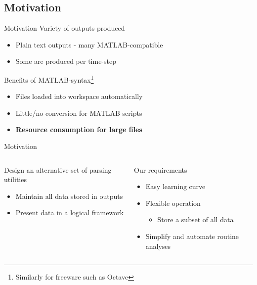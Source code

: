 \subsection{Motivation}
\begin{frame}{Motivation}
    Variety of outputs produced
    \begin{itemize}
        \item Plain text outputs - many MATLAB-compatible 
        \item Some are produced per time-step
    \end{itemize}
    Benefits of MATLAB-syntax\footnote{Similarly for freeware such as Octave}
    \begin{itemize}
        \item Files loaded into workspace automatically
        \item Little/no conversion for MATLAB scripts
        \item \textbf{Resource consumption for large files}
    \end{itemize}
\end{frame}

\begin{frame}{Motivation}
    \begin{columns}[T]
        \begin{column}{\colShare}
            Design an alternative set of parsing utilities
            \begin{itemize}
                \item Maintain all data stored in outputs
                \item Present data in a logical framework
            \end{itemize}
        \end{column}
        \begin{column}{\colShare}
            Our requirements
            \begin{itemize}
                \item Easy learning curve
                \item Flexible operation
                    \begin{itemize}
                        \item Store a subset of all data
                    \end{itemize}
                \item Simplify and automate routine analyses 
            \end{itemize}
        \end{column}
    \end{columns}
\end{frame}
